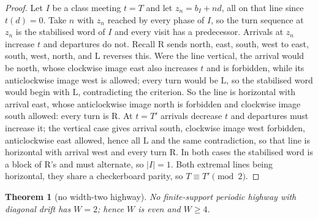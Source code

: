 \documentclass[11pt,reqno]{amsart}
\theoremstyle{plain}
\newtheorem{theorem}{Theorem}[section]
\theoremstyle{definition}
\newcommand{\drift}{d}
\newcommand{\turnR}{\mathrm{R}}
\newcommand{\turnL}{\mathrm{L}}
\begin{document}
\begin{proof}
Let $I$ be a class meeting $t=T$ and let $z_n=b_I+n\drift$, all on that line since
$t(\drift)=0$. Take $n$ with $z_n$ reached by every phase of $I$, so the turn sequence
at $z_n$ is the stabilised word of $I$ and every visit has a predecessor. Arrivals at
$z_n$ increase $t$ and departures do not. Recall $\turnR$ sends north, east, south,
west to east, south, west, north, and $\turnL$ reverses this. Were the line vertical,
the arrival would be north, whose clockwise image east also increases $t$ and is
forbidden, while its anticlockwise image west is allowed; every turn would be
$\turnL$, so the stabilised word would begin with $\turnL$, contradicting the
criterion. So the line is horizontal with arrival east, whose anticlockwise image
north is forbidden and clockwise image south allowed: every turn is $\turnR$. At
$t=T'$ arrivals decrease $t$ and departures must increase it; the vertical case gives
arrival south, clockwise image west forbidden, anticlockwise east allowed, hence all
$\turnL$ and the same contradiction, so that line is horizontal with arrival west and
every turn $\turnR$. In both cases the stabilised word is a block of $\turnR$'s and
must alternate, so $|I|=1$. Both extremal lines being horizontal, they share a
checkerboard parity, so $T\equiv T'\pmod2$.
\end{proof}

\begin{theorem}[no width-two highway]\label{thm:width2}
No finite-support periodic highway with diagonal drift has $W=2$; hence $W$ is even
and $W\ge4$.
\end{theorem}
\end{document}
